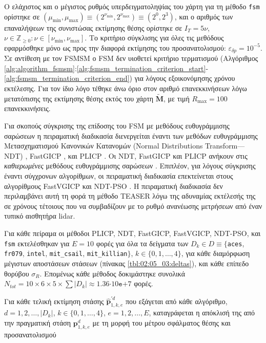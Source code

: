 Ο ελάχιστος και ο μέγιστος ρυθμός υπερδειγματοληψίας του χάρτη για τη μέθοδο
\texttt{fsm} ορίστηκε σε $(\mu_{\min},\mu_{\max}) \equiv
(2^{\nu_{\min}},2^{\nu_{\max}}) \equiv (2^0,2^3)$, και ο αριθμός των
επαναλήψεων της συνιστώσας εκτίμησης θέσης ορίστηκε σε $I_T=5\nu$, $\nu \in
\mathbb{Z}_{\geq 0}: \nu \in [\nu_{\min}, \nu_{\max}]$. Το κριτήριο σύγκλισης
για όλες τις μεθόδους εφαρμόσθηκε μόνο ως προς την διαφορά εκτίμησης του
προσανατολισμού: $\varepsilon_{\delta p} = 10^{-5}$. Σε αντίθεση με τον FSMSM ο
FSM δεν υιοθετεί κριτήριο τερματισμού (Αλγόριθμος
\ref{alg:algorithm_fsmsm}:\ref{alg:fsmsm_termination_criterion_start}-\ref{alg:fsmsm_termination_criterion_end})
για λόγους εξοικονόμησης χρόνου εκτέλεσης. Για τον ίδιο λόγο τέθηκε άνω όριο
στον αριθμό επανεκκινήσεων λόγω μετατόπισης της εκτίμησης θέσης εκτός του χάρτη
$\widetilde{\bm{M}}$, με τιμή $R_{\max} = 100$ επανεκκινήσεις.

Για σκοπούς σύγκρισης της επίδοσης του FSM με μεθόδους ευθυγράμμισης σαρώσεων η
πειραματική διαδικασία διενεργείται έναντι των μεθόδων ευθυγράμμισης
Μετασχηματισμού Κανονικών Κατανομών (Normal Distributions Transform---NDT)
\cite{Bibera,ndt_code}, FastGICP \cite{Segal2009a,fgicp_code}, και PLICP
\cite{Censi2008a,plicp_code}. Οι NDT, FastGICP και PLICP ανήκουν στις
\textit{καθιερωμένες} μεθόδους ευθυγράμμισης σαρώσεων
\cite{Koide2021a,Xu2018b,Sobreira2019b,Pishehvari2019b,Qingshan2019c,Pham2021b}.
Επιπλέον, για λόγους σύγκρισης έναντι σύγχρονων αλγορίθμων, οι πειραματική
διαδικασία επεκτείνεται στους αλγορίθμους FastVGICP
\cite{Koide2021a,fgicp_code} και NDT-PSO \cite{Bouraine2021,ndt_pso_code}. Η
πειραματική διαδικασία δεν περιλαμβάνει αυτή τη φορά τη μέθοδο TEASER λόγω της
αδυναμίας εκτέλεσής της σε χρόνους τέτοιους που να συμβαδίζουν με το ρυθμό
ανανέωσης μετρήσεων από έναν τυπικό αισθητήρα lidar.

Για κάθε πείραμα οι μέθοδοι PLICP, NDT, FastGICP, FastVGICP, NDT-PSO, και
\texttt{fsm} εκτελέσθηκαν για $E = 10$ φορές για όλα τα δείγματα των $D_k \in D
\equiv \{$\texttt{aces}, \texttt{fr079}, \texttt{intel}, \texttt{mit\_csail},
\texttt{mit\_killian}$\}$, $k \in \{0,1,\dots,4\}$, για κάθε διαμόρφωση
μέγιστων αποστάσεων στάσεων (πίνακας \ref{tbl:02:05_03:deltas}), και κάθε
επίπεδο θορύβου $\sigma_R$.  Επομένως κάθε μέθοδος δοκιμάστηκε συνολικά
$N_{tot} = 10 \times 6 \times 5 \times \sum |D_k|\approx
1.36$$\cdot10$$\texttt{e}$$+$$7$ φορές.

Για κάθε τελική εκτίμηση στάσης $\hat{\bm{p}}_{1,k,e}^{\prime d}$ που εξάγεται
από κάθε αλγόριθμο, $d = 1,2,\dots,|D_k|$, $k \in \{0,1,\dots,4\}$,
$e=1,2,\dots,E$, καταγράφεται η απόκλισή της από την πραγματική στάση
$\bm{p}_{1,k,e}^d$ με τη μορφή του μέτρου σφάλματος θέσης και προσανατολισμού


